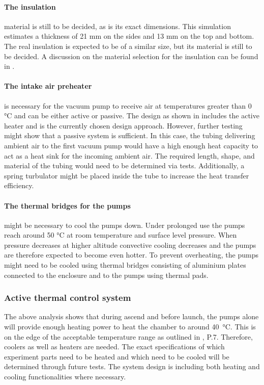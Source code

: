 \paragraph{The insulation} material is still to be decided, as is its exact dimensions.
This simulation estimates a thickness of 21 mm on the sides and 13 mm on the top and bottom. The real insulation is expected to be of a similar size, but its material is still to be decided.
A discussion on the material selection for the insulation can be found in .

\paragraph{The intake air preheater} is necessary for the vacuum pump to receive air at temperatures greater than 0 °C and can be either active or passive.
The design as shown in  includes the active heater and is the currently chosen design approach.
However, further testing might show that a passive system is sufficient. 
In this case, the tubing delivering ambient air to the first vacuum pump would have a high enough heat capacity to act as a heat sink for the incoming ambient air. 
The required length, shape, and material of the tubing would need to be determined via tests.
Additionally, a spring turbulator might be placed inside the tube to increase the heat transfer efficiency.

\paragraph{The thermal bridges for the pumps} might be necessary to cool the pumps down.
Under prolonged use the pumps reach around 50 °C at room temperature and surface level pressure.
When pressure decreases at higher altitude convective cooling decreases and the pumps are therefore expected to become even hotter.
To prevent overheating, the pumps might need to be cooled using thermal bridges consisting of aluminium plates connected to the enclosure and to the pumps using thermal pads. 

\subsubsection{Active thermal control system}
The above analysis shows that during ascend and before launch, the pumps alone will provide enough heating power to heat the chamber to around 40 °C. This is on the edge of the acceptable temperature range as outlined in , P.7. Therefore, coolers as well as heaters are needed. The exact specifications of which experiment parts need to be heated and which need to be cooled will be determined through future tests. The system design is including both heating and cooling functionalities where necessary.\par

